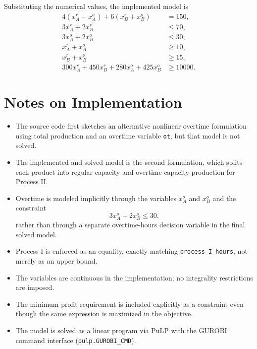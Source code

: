 Substituting the numerical values, the implemented model is
\begin{align}
4(x^r_A + x^o_A) + 6(x^r_B + x^o_B) &= 150, \\
3x^r_A + 2x^r_B &\le 70, \\
3x^o_A + 2x^o_B &\le 30, \\
x^r_A + x^o_A &\ge 10, \\
x^r_B + x^o_B &\ge 15, \\
300x^r_A + 450x^r_B + 280x^o_A + 425x^o_B &\ge 10000.
\end{align}

\section*{Notes on Implementation}

\begin{itemize}
    \item The source code first sketches an alternative nonlinear overtime formulation using total production and an overtime variable \texttt{ot}, but that model is not solved.
    \item The implemented and solved model is the second formulation, which splits each product into regular-capacity and overtime-capacity production for Process II.
    \item Overtime is modeled implicitly through the variables $x^o_A$ and $x^o_B$ and the constraint
    \[
    3x^o_A + 2x^o_B \le 30,
    \]
    rather than through a separate overtime-hours decision variable in the final solved model.
    \item Process I is enforced as an equality, exactly matching \texttt{process\_I\_hours}, not merely as an upper bound.
    \item The variables are continuous in the implementation; no integrality restrictions are imposed.
    \item The minimum-profit requirement is included explicitly as a constraint even though the same expression is maximized in the objective.
    \item The model is solved as a linear program via PuLP with the GUROBI command interface (\texttt{pulp.GUROBI\_CMD}).
\end{itemize}
